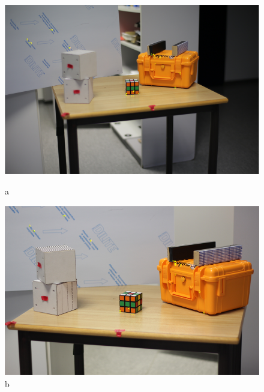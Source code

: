 \begin{figure}[!htb]
	\includegraphics[width=\linewidth]{images/PointsDetectedLeft.png}
	\caption{a}
	\label{fig:SurfRechts}
	\endminipage\hfill
	\includegraphics[width=\linewidth]{images/PointsDetectedRight.png}
	\caption{b}
	\label{fig:SurfLinks}
	\endminipage\hfill
\end{figure}

